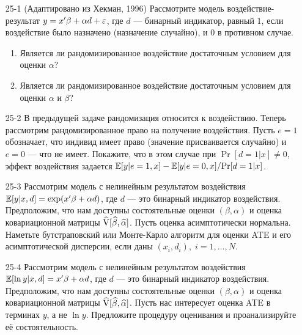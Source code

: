 \begin{enumerate}
\item[25-1] (Адаптировано из Хекман, 1996) Рассмотрите модель воздействие-результат $y = x' \beta +\alpha d + \varepsilon$, где $d$ --- бинарный индикатор, равный 1, если воздействие было назначено (назначение случайно), и 0 в противном случае.
\begin{enumerate}
\item Является ли рандомизированное воздействие достаточным условием для оценки $\alpha$? 
\item Является ли рандомизированное воздействие достаточным условием для оценки $\alpha$ и $\beta$? 
\end{enumerate}

\item[25-2] В предыдущей задаче рандомизация относится к воздействию. Теперь рассмотрим рандомизированное право на получение воздействия. Пусть $e = 1$ обозначает, что индивид имеет право (значение присваивается случайно) и $e = 0$ --- что не имеет. Покажите, что в этом случае при $\Pr [d = 1 | x] \ne 0$, эффект воздействия задается $\mathbb{E} [y | e = 1, x] - \mathbb{E} [y | e = 0, x]/\mathrm{Pr}[d = 1|x]$.

\item[25-3] Рассмотрим модель с нелинейным результатом воздействия $\mathbb{E} [y|x,d] = \exp (x'\beta + \alpha d)$, где $d$ --- это бинарный индикатор воздействия. Предположим, что нам доступны состоятельные оценки $(\beta, \alpha)$ и оценка ковариационной матрицы $\widehat {\mathrm{V}} [\widehat{\beta}, \widehat{\alpha}]$. Пусть оценка асимптотически нормальна. Наметьте бутстраповский или Монте-Карло алгоритм для оценки ATE и его асимптотической дисперсии, если даны $(x_i , d_i), \; i = 1, \dots, N$. 

\item[25-4] Рассмотрим модель с нелинейным результатом воздействия $\mathbb{E} [\ln y|x,d] = x'\beta + \alpha d$, где $d$ --- это бинарный индикатор воздействия. Предположим, что нам доступны состоятельные оценки $(\beta, \alpha)$ и оценка ковариационной матрицы $\widehat {\mathrm{V}} [\widehat{\beta}, \widehat{\alpha}]$. Пусть нас интересует оценка ATE в терминах $y$, а не $\ln y$. Предложите процедуру оценивания и проанализируйте её состоятельность. 


\end{enumerate}
